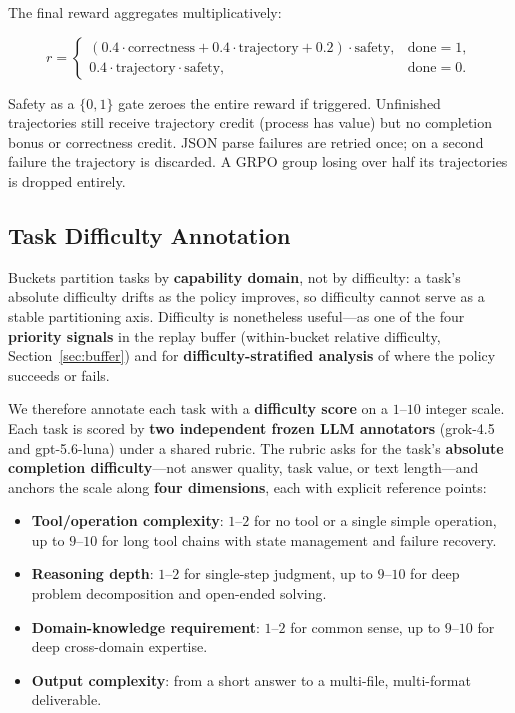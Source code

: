 The final reward aggregates multiplicatively:

\begin{equation}
  r =
  \begin{cases}
    (0.4\cdot\text{correctness} + 0.4\cdot\text{trajectory} + 0.2)\cdot\text{safety}, & \text{done}=1,\\[4pt]
    0.4\cdot\text{trajectory}\cdot\text{safety}, & \text{done}=0.
  \end{cases}
  \label{eq:reward}
\end{equation}

Safety as a $\{0,1\}$ gate zeroes the entire reward if triggered. Unfinished trajectories still receive trajectory credit (process has value) but no completion bonus or correctness credit. JSON parse failures are retried once; on a second failure the trajectory is discarded. A GRPO group losing over half its trajectories is dropped entirely.

\subsection{Task Difficulty Annotation}
\label{sec:difficulty}

Buckets partition tasks by \textbf{capability domain}, not by difficulty: a task's absolute difficulty drifts as the policy improves, so difficulty cannot serve as a stable partitioning axis. Difficulty is nonetheless useful---as one of the four \textbf{priority signals} in the replay buffer (within-bucket relative difficulty, Section~\ref{sec:buffer}) and for \textbf{difficulty-stratified analysis} of where the policy succeeds or fails.

We therefore annotate each task with a \textbf{difficulty score} on a $1$--$10$ integer scale. Each task is scored by \textbf{two independent frozen LLM annotators} (grok-4.5 and gpt-5.6-luna) under a shared rubric. The rubric asks for the task's \textbf{absolute completion difficulty}---not answer quality, task value, or text length---and anchors the scale along \textbf{four dimensions}, each with explicit reference points:

\begin{itemize}
  \item \textbf{Tool/operation complexity}: $1$--$2$ for no tool or a single simple operation, up to $9$--$10$ for long tool chains with state management and failure recovery.
  \item \textbf{Reasoning depth}: $1$--$2$ for single-step judgment, up to $9$--$10$ for deep problem decomposition and open-ended solving.
  \item \textbf{Domain-knowledge requirement}: $1$--$2$ for common sense, up to $9$--$10$ for deep cross-domain expertise.
  \item \textbf{Output complexity}: from a short answer to a multi-file, multi-format deliverable.
\end{itemize}

